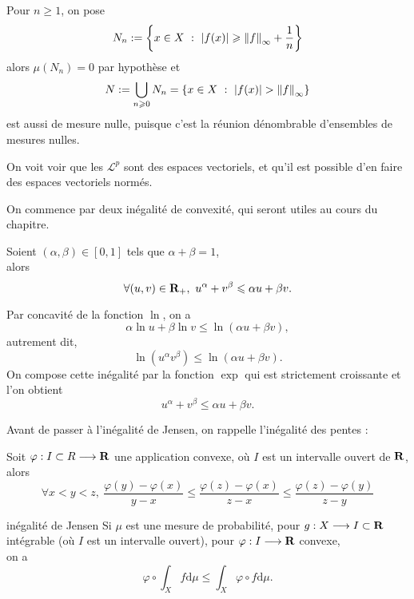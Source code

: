 \documentclass[a4paper,11pt, twoside]{article}
\begin{document}
\begin{Proof}
  Pour $n\geqslant 1$, on pose 
  $$N_n:=\ens{x\in X\ :\ \abs{f(x)}\geqslant \norm{f}_\infty+\frac1n}$$
  alors $\mu(N_n)=0$ par hypothèse et 
  $$N:=\bigcup_{n\geqslant 0}N_n=\ens{x\in X\ :\ \abs{f(x)}>\norm{f}_\infty}$$
  est aussi de mesure nulle, puisque c'est la réunion dénombrable d'ensembles de mesures nulles.
\end{Proof}


On voit voir que les $\mathcal L^p$ sont des espaces vectoriels, et qu'il est possible d'en faire des espaces vectoriels normés.

On commence par deux inégalité de convexité, qui seront utiles au cours du chapitre.




\begin{prop}
  Soient $(\alpha,\beta)\in[0,1]$ tels que $\alpha+\beta=1$,\\

  alors 
  $$\forall (u,v)\in\R_+,\ u^\alpha+v^\beta\leqslant \alpha u+\beta v.$$
\end{prop}


\begin{Proof}
  Par concavité de la fonction $\ln$, on a 
  $$\alpha\ln u+\beta\ln v\leqslant\ln\left(\alpha u+\beta v\right),$$
  autrement dit, 
  $$\ln\left(u^\alpha v^\beta\right)\leqslant\ln\left(\alpha u+\beta v\right).$$
  On compose cette inégalité par la fonction $\exp$ qui est strictement croissante et l'on obtient
  $$u^\alpha+v^\beta\leqslant \alpha u+\beta v.$$
\end{Proof}

Avant de passer à l'inégalité de Jensen, on rappelle l'inégalité des pentes : 


\begin{prop}
  Soit $\varphi:I\subset R\longrightarrow\mathbf R$ une application convexe, où $I$ est un intervalle ouvert de $\mathbf R$,\\

  alors 
  $$\forall x<y<z,\ \frac{\varphi(y)-\varphi(x)}{y-x}\leqslant\frac{\varphi(z)-\varphi(x)}{z-x}\leqslant \frac{\varphi(z)-\varphi(y)}{z-y}$$
\end{prop}


\begin{propC}{inégalité de Jensen}
  Si $\mu$ est une mesure de probabilité, pour $g:X\longrightarrow I\subset \mathbf R$ intégrable (où $I$ est un intervalle ouvert), pour $\varphi:I\longrightarrow\mathbf R$ convexe,\\

  on a 
  $$\varphi\circ\int_Xf\mathrm d\mu\leqslant \int_X\varphi\circ f\mathrm d\mu.$$
\end{propC}
\end{document}
